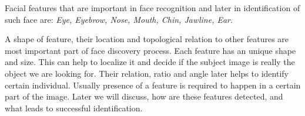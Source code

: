 Facial features that are important in face recognition and later in identification of such face are: \textit{Eye, Eyebrow, Nose, Mouth, Chin, Jawline, Ear}.

A shape of feature, their location and topological relation to other features are most important part of face discovery process. Each feature has an unique shape and size. This can help to localize it and decide if the subject image is really the object we are looking for. Their relation, ratio and angle later helps to identify certain individual. Usually presence of a feature is required to happen in a certain part of the image. Later we will discuss, how are these features detected, and what leads to successful identification.
